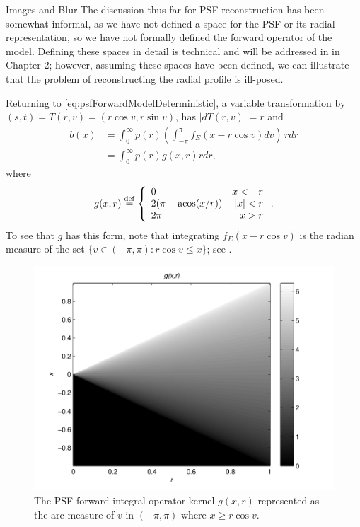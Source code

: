 \begin{chapter}{Images and Blur}
  The discussion thus far for PSF reconstruction has been somewhat informal, as we have not defined a space for the PSF or its radial representation, so we have not formally defined the forward operator of the model.
  Defining these spaces in detail is technical and will be addressed in in Chapter 2; however, assuming these spaces have been defined, we can illustrate that the problem of reconstructing the radial profile is ill-posed.

  Returning to \eqref{eq:psfForwardModelDeterministic}, a variable transformation
  by $(s,t) = T(r,v) = (r\cos v,r\sin v)$, has $|dT(r,v)| = r$ and 
  \begin{align}
    b(x) &= \int_0^\infty p(r) \left( \int_{-\pi}^\pi f_E(x - r\cos v)dv \right)\,r dr\nonumber \\
         &= \int_0^\infty p(r) g(x,r) r dr, \label{eq:radialForwardModelDeterministic}
  \end{align}
where
\begin{equation} \label{eq:radialForwardKernel}
  g(x,r) \stackrel{\rm def}{=} \left\{\begin{array}{lr}
    0 & x < - r\\
    2(\pi - \operatorname*{acos}(x/r)) & |x| < r\\
    2\pi &  x> r
  \end{array}\right..  
\end{equation}
  To see that $g$ has this form, note that integrating $f_E(x-r\cos v)$ is the radian measure of the set $\{v\in(-\pi,\pi): r\cos v \le x\}$; see .  

\begin{figure}
  \begin{center}
  \includegraphics[width=.5\textwidth]{figures/g_function.pdf}
\end{center}
\caption{ The PSF forward integral operator kernel $g(x,r)$ represented as the arc measure of $v$ in $(-\pi,\pi)$ where $x \ge r\cos v$. }\label{fig:radialForwardKernel}
\end{figure}


\end{chapter}
